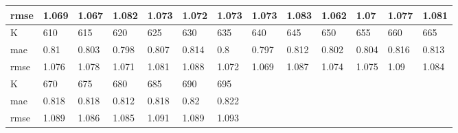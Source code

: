 \begin{appendices}
\begin{center}
\begin{tabularx}{\textwidth}{|l|X|X|X|X|X|X|X|X|X|X|X|X|}
		rmse & 1.069 & 1.067 & 1.082 & 1.073 & 1.072 & 1.073 & 1.073 & 1.083 & 1.062 & 1.07 & 1.077 & 1.081 \\ \hline 
		\hline 
		K & 610 & 615 & 620 & 625 & 630 & 635 & 640 & 645 & 650 & 655 & 660 & 665 \\ \hline 
		mae & 0.81 & 0.803 & 0.798 & 0.807 & 0.814 & 0.8 & 0.797 & 0.812 & 0.802 & 0.804 & 0.816 & 0.813 \\ \hline 
		rmse & 1.076 & 1.078 & 1.071 & 1.081 & 1.088 & 1.072 & 1.069 & 1.087 & 1.074 & 1.075 & 1.09 & 1.084 \\ \hline 
		\hline 
		K & 670 & 675 & 680 & 685 & 690 & 695  & & & & & & \\ \hline 
		mae & 0.818 & 0.818 & 0.812 & 0.818 & 0.82 & 0.822 & & & & & &  \\ \hline 
		rmse & 1.089 & 1.086 & 1.085 & 1.091 & 1.089 & 1.093  & & & & & & \\ \hline 
	\end{tabularx} 
\end{center}


\end{appendices}
